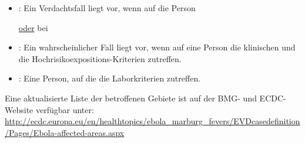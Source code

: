 {\begin{itemize}
  \item {}: 
  Ein Verdachtsfall liegt vor, wenn auf die
  Person 
  \underline{oder} bei
  \item {}:
  Ein wahrscheinlicher Fall liegt vor, wenn auf
  eine Person die klinischen und die
  Hochrisikoexpositions-Kriterien zutreffen.
  \item {}: 
  Eine Person, auf die die Laborkriterien zutreffen.
\end{itemize}


\begin{Literary}
 \cite{HahnMikrobio6}

 \cite{BmgEbolaFactsheet20141103}

 \cite{BmgEbolaFalldefinition20141028}
 
Eine aktualisierte Liste der betroffenen Gebiete ist auf der BMG- und 
ECDC-Website verfügbar unter:
    \url{http://ecdc.europa.eu/en/healthtopics/ebola_marburg_fevers/EVDcasedefinition/Pages/Ebola-affected-areas.aspx}

\end{Literary}

%
%
%


%

}{}





\ChapterEnd